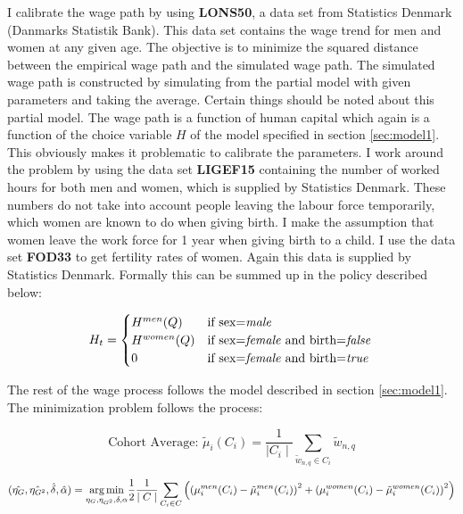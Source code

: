 I calibrate the wage path by using \textbf{LONS50}, a data set from Statistics Denmark (Danmarks Statistik Bank). This data set contains the wage trend for men and women at any given age. The objective is to minimize the squared distance between the empirical wage path and the simulated wage path. The simulated wage path is constructed by simulating from the partial model with given parameters and taking the average. Certain things should be noted about this partial model. The wage path is a function of human capital which again is a function of the choice variable $H$ of the model specified in section \ref{sec:model1}. This obviously makes it problematic to calibrate the parameters. I work around the problem by using the data set \textbf{LIGEF15} containing the number of worked hours for both men and women, which is supplied by Statistics Denmark. These numbers do not take into account people leaving the labour force temporarily, which women are known to do when giving birth. I make the assumption that women leave the work force for 1 year when giving birth to a child. I use the data set \textbf{FOD33} to get fertility rates of women. Again this data is supplied by Statistics Denmark. Formally this can be summed up in the policy described below:

\begin{equation}
    H_t = \begin{cases}
        H^{men}(Q) & \text{if sex=\textit{male}} \\
        H^{women}(Q) & \text{if sex=\textit{female} and birth=\textit{false}} \\
        0 & \text{if sex=\textit{female} and birth=\textit{true} }\\
    \end{cases}    
\end{equation}

The rest of the wage process follows the model described in section \ref{sec:model1}. The minimization problem follows the process:

\begin{equation}
    \text{Cohort Average: } {\tilde{\mu}}_i (C_i) = \frac{1}{\mid C_i \mid} \sum_{\tilde{w}_{n, q} \in C_i} {\tilde{w}_{n, q}}
\end{equation}

\begin{equation}
 (\hat{\eta_G}, \hat{\eta_{G^2}}, \hat{\delta}, \hat{\alpha})   =  \underset{\eta_G, \eta_{G^2}, \delta, \alpha}{\operatorname*{arg\,min}}  \frac{1}{2}\frac{1}{\mid C \mid } \sum_{C_i \in C} \left(\left( \mu_{i}^{men}(C_i)  - \tilde{\mu}_i^{men}(C_i)\right)^2 + \left( \mu_{i}^{women}(C_i)  - \tilde{\mu}_i^{women}(C_i)\right)^2 \right)
\end{equation}

